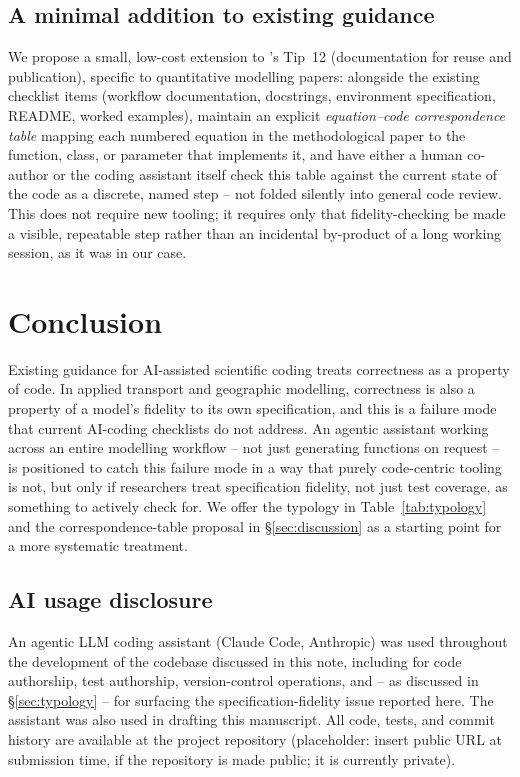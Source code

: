 \documentclass[11pt]{article}
\begin{document}
\subsection{A minimal addition to existing guidance}

We propose a small, low-cost extension to \citeauthor{bridgeford2026}'s
Tip~12 (documentation for reuse and publication), specific to
quantitative modelling papers: alongside the existing checklist items
(workflow documentation, docstrings, environment specification, README,
worked examples), maintain an explicit \emph{equation--code
correspondence table} mapping each numbered equation in the
methodological paper to the function, class, or parameter that
implements it, and have either a human co-author or the coding
assistant itself check this table against the current state of the
code as a discrete, named step -- not folded silently into general code
review. This does not require new tooling; it requires only that
fidelity-checking be made a visible, repeatable step rather than an
incidental by-product of a long working session, as it was in our case.

\section{Conclusion}
\label{sec:conclusion}

Existing guidance for AI-assisted scientific coding treats correctness
as a property of code. In applied transport and geographic modelling,
correctness is also a property of a model's fidelity to its own
specification, and this is a failure mode that current AI-coding
checklists do not address. An agentic assistant working across an
entire modelling workflow -- not just generating functions on request
-- is positioned to catch this failure mode in a way that purely
code-centric tooling is not, but only if researchers treat
specification fidelity, not just test coverage, as something to
actively check for. We offer the typology in Table~\ref{tab:typology}
and the correspondence-table proposal in \S\ref{sec:discussion} as a
starting point for a more systematic treatment.

\subsection*{AI usage disclosure}
An agentic LLM coding assistant (Claude Code, Anthropic) was used
throughout the development of the codebase discussed in this note,
including for code authorship, test authorship, version-control
operations, and -- as discussed in \S\ref{sec:typology} -- for
surfacing the specification-fidelity issue reported here. The
assistant was also used in drafting this manuscript. All code, tests,
and commit history are available at the project repository
(placeholder: insert public URL at submission time, if the repository
is made public; it is currently private).
\end{document}
